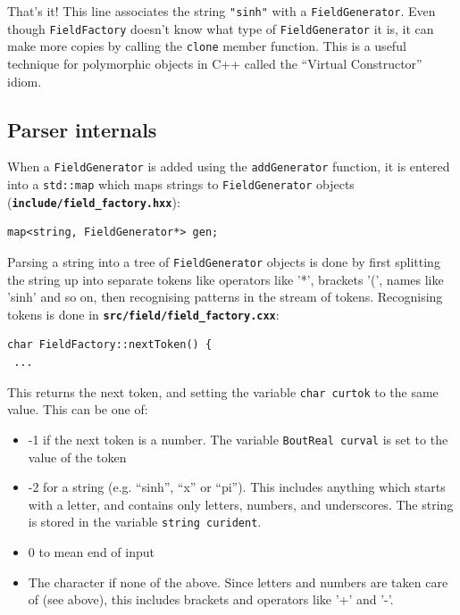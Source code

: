 \documentclass[12pt]{article}
\newcommand{\file}[1]{\texttt{\bf #1}}
\begin{document}
That's it! This line associates the string \lstinline!"sinh"! with a \lstinline!FieldGenerator!. Even
though \lstinline!FieldFactory! doesn't know what type of \lstinline!FieldGenerator! it is, it can make more copies
by calling the \lstinline!clone! member function. This is a useful technique for polymorphic objects in C++ called the
``Virtual Constructor'' idiom.

\subsection{Parser internals}

When a \lstinline!FieldGenerator! is added using the \lstinline!addGenerator! function,
it is entered into a \lstinline!std::map! which maps strings to \lstinline!FieldGenerator!
objects (\file{include/field\_factory.hxx}):

\begin{lstlisting}[firstnumber=223]
map<string, FieldGenerator*> gen;
\end{lstlisting}

Parsing a string into a tree of \lstinline!FieldGenerator! objects is done by first splitting the string up
into separate tokens like operators like '*', brackets '(', names like 'sinh' and so on, then 
recognising patterns in the stream of tokens. Recognising tokens is done in \file{src/field/field\_factory.cxx}:
\begin{lstlisting}[firstnumber=259]
char FieldFactory::nextToken() {
 ...
\end{lstlisting}

This returns the next token, and setting the variable \lstinline!char curtok! to the same value. 
This can be one of:
\begin{itemize}
\item -1 if the next token is a number. The variable \lstinline!BoutReal curval! is set to
  the value of the token
\item -2 for a string (e.g. ``sinh'', ``x'' or ``pi''). This includes anything which starts with a letter, and
  contains only letters, numbers, and underscores. The string is stored in the variable \lstinline!string curident!. 
\item 0 to mean end of input
\item The character if none of the above. Since letters and numbers are taken care of (see above), this includes
  brackets and operators like '+' and '-'.
\end{itemize}
\end{document}
